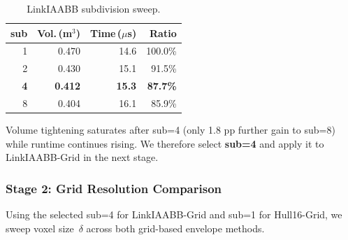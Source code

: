 \documentclass[journal]{IEEEtran}
\begin{document}
\begin{table}[ht]
\centering
\caption{LinkIAABB subdivision sweep.}
\label{tab:sub_sweep}
\begin{tabular}{@{}rrrr@{}}
\toprule
\textbf{sub} & \textbf{Vol.\,(m$^{3}$)} & \textbf{Time\,($\mu$s)}
  & \textbf{Ratio} \\
\midrule
1 & 0.470 & 14.6 & 100.0\% \\
2 & 0.430 & 15.1 &  91.5\% \\
\textbf{4} & \textbf{0.412} & \textbf{15.3} & \textbf{87.7\%} \\
8 & 0.404 & 16.1 &  85.9\% \\
\bottomrule
\end{tabular}
\end{table}

Volume tightening saturates after sub=4 (only 1.8 pp further gain to
sub=8) while runtime continues rising.  We therefore select
\textbf{sub=4} and apply it to LinkIAABB-Grid in the next stage.

\subsubsection{Stage 2: Grid Resolution Comparison}

Using the selected sub=4 for LinkIAABB-Grid and sub=1 for Hull16-Grid,
we sweep voxel size~$\delta$ across both grid-based envelope methods.

\begin{table}[ht]
\centering
\caption{Grid-resolution sweep: LinkIAABB-Grid vs.\ Hull16-Grid.}
\label{tab:grid_sweep}
\end{table}
\end{document}
